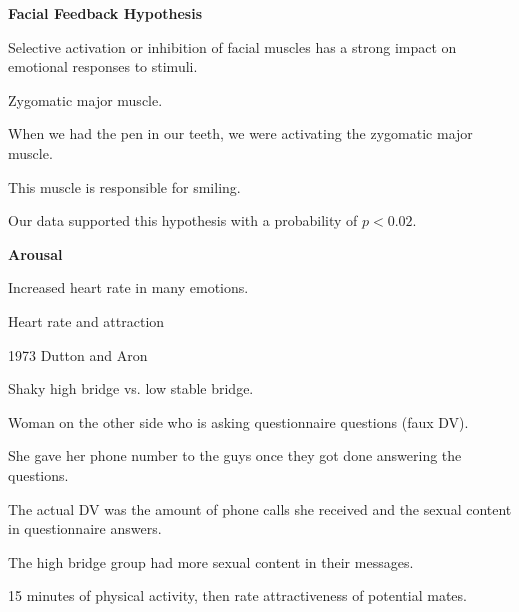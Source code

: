 \begin{enumerate}
\begin{coloredlist}
\begin{coloredlist}
        \end{coloredlist}
        \item \textbf{Facial Feedback Hypothesis}
        \begin{coloredlist}
            \item Selective activation or inhibition of facial muscles has a strong impact on emotional responses to stimuli.
            \item Zygomatic major muscle.
            \begin{coloredlist}
                \item When we had the pen in our teeth, we were activating the zygomatic major muscle.
                \item This muscle is responsible for smiling.
            \end{coloredlist}
            \item Our data supported this hypothesis with a probability of \(p < 0.02\).
        \end{coloredlist}
        \item \textbf{Arousal}
        \begin{coloredlist}
            \item Increased heart rate in many emotions.
            \item Heart rate and attraction
            \begin{coloredlist}
                \item 1973 Dutton and Aron
                \begin{coloredlist}
                    \item Shaky high bridge vs. low stable bridge.
                    \item Woman on the other side who is asking questionnaire questions (faux DV).
                    \item She gave her phone number to the guys once they got done answering the questions.
                    \item The actual DV was the amount of phone calls she received and the sexual content in questionnaire answers.
                    \item The high bridge group had more sexual content in their messages.
                \end{coloredlist}
                \item 15 minutes of physical activity, then rate attractiveness of potential mates.
            \end{coloredlist}
        \end{coloredlist}
    \end{coloredlist}
\end{enumerate}

